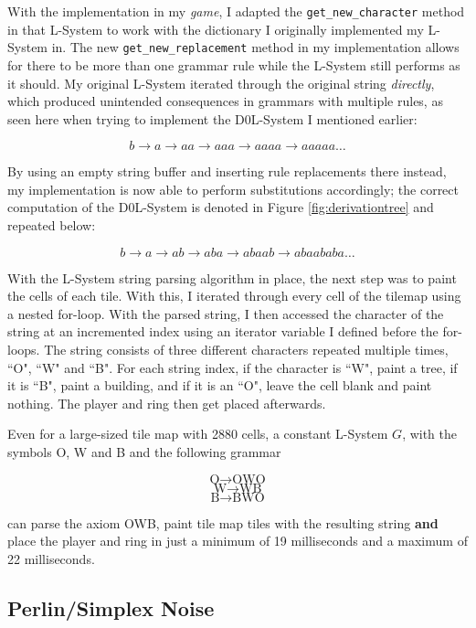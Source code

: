 With the implementation in my \emph{game}, I adapted the \verb|get_new_character| method in that L-System to work with the dictionary I originally implemented my L-System in. The new \verb|get_new_replacement| method in my implementation allows for there to be more than one grammar rule while the L-System still performs as it should. My original L-System iterated through the original string \textit{directly}, which produced unintended consequences in grammars with multiple rules, as seen here when trying to implement the D0L-System I mentioned earlier\cite{lsystemintro}:

$$ b \rightarrow a \rightarrow aa \rightarrow aaa \rightarrow aaaa \rightarrow aaaaa \ldots $$

By using an empty string buffer and inserting rule replacements there instead, my implementation is now able to perform substitutions accordingly; the correct computation of the D0L-System is denoted in Figure \ref{fig:derivationtree} and repeated below:

$$ b \rightarrow a \rightarrow ab \rightarrow aba \rightarrow abaab \rightarrow abaababa \ldots $$

With the L-System string parsing algorithm in place, the next step was to paint the cells of each tile. With this, I iterated through every cell of the tilemap using a nested for-loop. With the parsed string, I then accessed the character of the string at an incremented index using an iterator variable I defined before the for-loops. The string consists of three different characters repeated multiple times, ``O", ``W" and ``B". For each string index, if the character is ``W", paint a tree, if it is ``B", paint a building, and if it is an ``O", leave the cell blank and paint nothing. The player and ring then get placed afterwards.

Even for a large-sized tile map with 2880 cells, a constant L-System $G$, with the symbols O, W and B and the following grammar

$$ \mbox{O} \rightarrow \mbox{O}\mbox{W}\mbox{O} $$
$$ \mbox{W} \rightarrow \mbox{W}\mbox{B} $$
$$ \mbox{B} \rightarrow \mbox{B}\mbox{W}\mbox{O} $$

can parse the axiom OWB, paint tile map tiles with the resulting string \textbf{and} place the player and ring in just a minimum of 19 milliseconds and a maximum of 22 milliseconds.

\subsection{Perlin/Simplex Noise}

